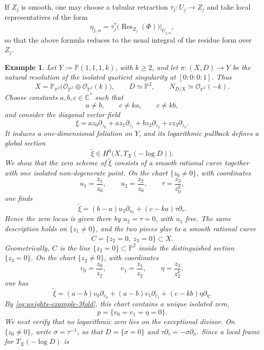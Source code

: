 \documentclass[12pt,a4paper,dvipsnames,x11names]{amsart}
\numberwithin{equation}{section}
\theoremstyle{plain}
\newtheorem{example}[theorem]{Example}
\theoremstyle{definition}
\theoremstyle{remark}
\begin{document}
If $Z_j$ is smooth, one may choose a tubular retraction $\tau_j:U_j\to Z_j$ and take local representatives of the form
$$
\eta_{j,\alpha}=\tau_j^*\bigl(\operatorname{Res}_{Z_j}(\Phi)\bigr)|_{U_{j,\alpha}},
$$
so that the above formula reduces to the usual integral of the residue form over $Z_j$.
\begin{example}\rm \label{exe}
Let $Y:=\mathbb P(1,1,1,k)$, with $k\ge 2$, and let
$
\pi:(X,D)\to Y
$
be the natural resolution of the isolated quotient singularity at $[0:0:0:1]$. Thus
$$
X=\mathbb P_{\mathbb P^2}\bigl(\mathcal O_{\mathbb P^2}\oplus \mathcal O_{\mathbb P^2}(k)\bigr),
\qquad
D\simeq \mathbb P^2,
\qquad
N_{D/X}\simeq \mathcal O_{\mathbb P^2}(-k).
$$
Choose constants $a,b,c\in \mathbb C^*$ such that
\begin{equation}\label{eq:weights-example-3fold}
a\neq b,
\qquad
c\neq ka,
\qquad
c\neq kb,
\end{equation}
and consider the diagonal vector field
$$
\xi
=
a z_0\partial_{z_0}
+
a z_1\partial_{z_1}
+
b z_2\partial_{z_2}
+
c z_3\partial_{z_3}.
$$
It induces a one-dimensional foliation on $Y$, and its logarithmic pullback defines a global section
$$
\widetilde\xi\in H^0\bigl(X,T_X(-\log D)\bigr).
$$
We show that the zero scheme of $\widetilde\xi$ consists of a smooth rational curve together with one isolated non-degenerate point.
On the chart $\{z_0\neq 0\}$, with coordinates
$$
u_1=\frac{z_1}{z_0},
\qquad
u_2=\frac{z_2}{z_0},
\qquad
\tau=\frac{z_3}{z_0^k},
$$
one finds
\begin{equation}\label{eq:field-u-chart-example-3fold}
\widetilde\xi
=
(b-a)u_2\partial_{u_2}
+
(c-ka)\tau\partial_{\tau}.
\end{equation}
Hence the zero locus is given there by $u_2=\tau=0$, with $u_1$ free. The same description holds on $\{z_1\neq 0\}$, and the two pieces glue to a smooth rational curve
$$
C=\overline{\{z_2=0,\ z_3=0\}}\subset X.
$$
Geometrically, $C$ is the line $\{z_2=0\}\subset \mathbb P^2$ inside the distinguished section $\{z_3=0\}$.
On the chart $\{z_2\neq 0\}$, with coordinates
$$
v_0=\frac{z_0}{z_2},
\qquad
v_1=\frac{z_1}{z_2},
\qquad
\eta=\frac{z_3}{z_2^k},
$$
one has
$$
\widetilde\xi
=
(a-b)v_0\partial_{v_0}
+
(a-b)v_1\partial_{v_1}
+
(c-kb)\eta\partial_{\eta}.
$$
By \eqref{eq:weights-example-3fold}, this chart contains a unique isolated zero,
$$
p=\{v_0=v_1=\eta=0\}.
$$
We next verify that no logarithmic zero lies on the exceptional divisor. On $\{z_0\neq 0\}$, write $\sigma=\tau^{-1}$, so that $D=\{\sigma=0\}$ and $\tau\partial_\tau=-\sigma\partial_\sigma$. Since a local frame for $T_X(-\log D)$ is

\end{example}
\end{document}

